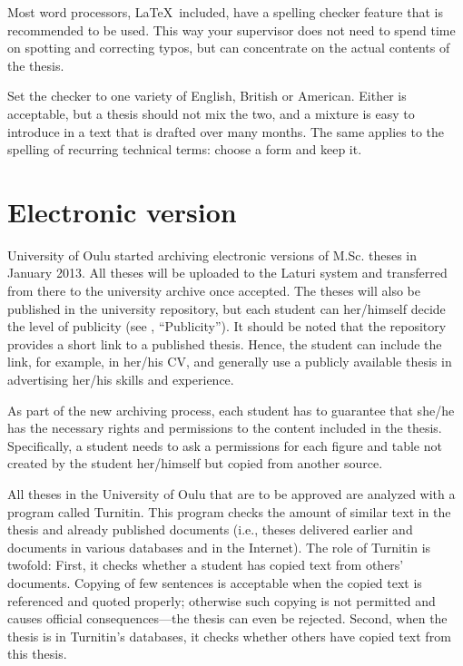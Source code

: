 Most word processors, \LaTeX\ included, have a spelling checker
feature that is recommended to be used. This way your supervisor does
not need to spend time on spotting and correcting typos, but can
concentrate on the actual contents of the thesis.

Set the checker to one variety of English, British or American. Either
is acceptable, but a thesis should not mix the two, and a mixture is
easy to introduce in a text that is drafted over many months. The same
applies to the spelling of recurring technical terms: choose a form and
keep it.

\section{Electronic version}

University of Oulu started archiving electronic versions of M.Sc.
theses in January 2013. All theses will be uploaded to the Laturi
system and transferred from there to the university archive once
accepted. The theses will also be published in the university
repository, but each student can her/himself decide the level of
publicity (see , “Publicity”). It should be
noted that the repository provides a short link to a published
thesis. Hence, the student can include the link, for example, in
her/his CV, and generally use a publicly available thesis in
advertising her/his skills and experience.

As part of the new archiving process, each student has to guarantee
that she/he has the necessary rights and permissions to the content
included in the thesis. Specifically, a student needs to ask a
permissions for each figure and table not created by the student
her/himself but copied from another source.

All theses in the University of Oulu that are to be approved are
analyzed with a program called Turnitin. This program checks the
amount of similar text in the thesis and already published documents
(i.e., theses delivered earlier and documents in various databases and
in the Internet). The role of Turnitin is twofold: First, it checks
whether a student has copied text from others’ documents. Copying of
few sentences is acceptable when the copied text is referenced and
quoted properly; otherwise such copying is not permitted and causes
official consequences---the thesis can even be rejected. Second, when
the thesis is in Turnitin’s databases, it checks whether others have
copied text from this thesis.

